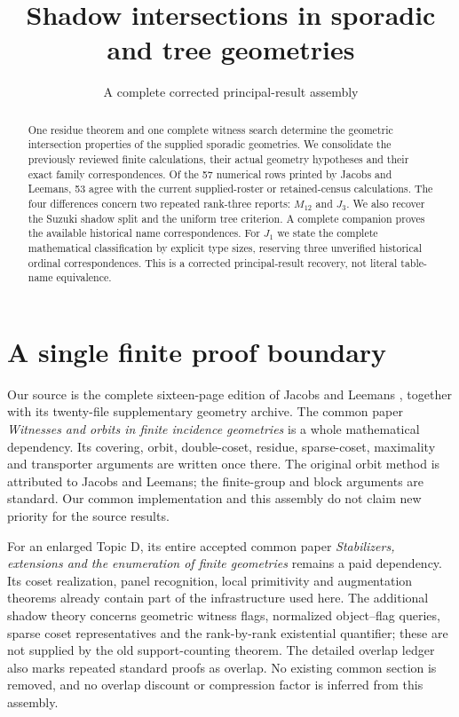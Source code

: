 \documentclass[11pt,a4paper]{article}
\title{Shadow intersections in sporadic and tree geometries}
\author{A complete corrected principal-result assembly}
\date{}
\begin{document}
\maketitle
\begin{abstract}
One residue theorem and one complete witness search determine the
geometric intersection properties of the supplied sporadic geometries.
We consolidate the previously reviewed finite calculations, their actual
geometry hypotheses and their exact family correspondences. Of the
57 numerical rows printed by Jacobs and Leemans, 53 agree with the
current supplied-roster or retained-census calculations. The four
differences concern two repeated rank-three reports: $M_{12}$ and $J_3$.
We also recover the Suzuki shadow split and the uniform tree criterion.
A complete companion proves the available historical name correspondences.
For $J_1$ we state the complete mathematical classification by explicit
type sizes, reserving three unverified historical ordinal correspondences.
This is a corrected principal-result recovery, not literal table-name
equivalence.
\end{abstract}

\section{A single finite proof boundary}
Our source is the complete sixteen-page edition of Jacobs and Leemans
\cite{jl}, together with its twenty-file supplementary geometry archive.
The common paper \emph{Witnesses and orbits in finite incidence geometries}
is a whole mathematical dependency. Its covering, orbit, double-coset,
residue, sparse-coset, maximality and transporter arguments are written
once there. The original orbit method is attributed to Jacobs and
Leemans; the finite-group and block arguments are standard. Our common
implementation and this assembly do not claim new priority for the
source results.

For an enlarged Topic D, its entire accepted common paper
\emph{Stabilizers, extensions and the enumeration of finite geometries}
remains a paid dependency. Its coset realization, panel recognition,
local primitivity and augmentation theorems already contain part of
the infrastructure used here. The additional shadow theory concerns
geometric witness flags, normalized object--flag queries, sparse coset
representatives and the rank-by-rank existential quantifier; these are
not supplied by the old support-counting theorem. The detailed overlap
ledger also marks repeated standard proofs as overlap. No existing
common section is removed, and no overlap discount or compression
factor is inferred from this assembly.
\end{document}
